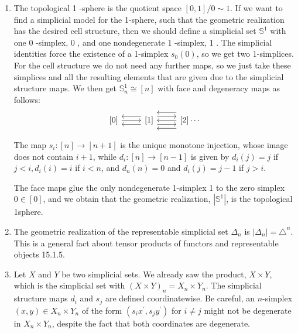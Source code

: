 \begin{example}
    \begin{enumerate}
        \item The topological 1 -sphere is the quotient space $[0,1] / 0 \sim 1$. If we want to find a simplicial model for the 1-sphere, such that the geometric realization has the desired cell structure, then we should define a simplicial set $\mathbb{S}^1$ with one 0 -simplex, 0 , and one nondegenerate 1 -simplex, 1 . The simplicial identities force the existence of a 1-simplex $s_0(0)$, so we get two 1-simplices. For the cell structure we do not need any further maps, so we just take these simplices and all the resulting elements that are given due to the simplicial structure maps. We then get $\mathbb{S}_n^1 \cong[n]$ with face and degeneracy maps as follows:
$$
\begin{tikzcd}
     {[0]} \ar[r] \ar[r, leftarrow, shift left =2] \ar[r, leftarrow, shift right =2] & {[1]} \ar[r, leftarrow] \ar[r, leftarrow, shift left =4] \ar[r, leftarrow, shift right =4] \ar[r, shift left =2] \ar[r, shift right =2] & {[2]}  \cdots
    \end{tikzcd}
$$
        
        The map $s_i:[n] \rightarrow[n+1]$ is the unique monotone injection, whose image does not contain $i+1$, while $d_i:[n] \rightarrow[n-1]$ is given by $d_i(j)=j$ if $j<i, d_i(i)=i$ if $i<n$, and $d_n(n)=0$ and $d_i(j)=j-1$ if $j>i$.
        
        The face maps glue the only nondegenerate 1-simplex 1 to the zero simplex $0 \in[0]$, and we obtain that the geometric realization, $\left|\mathbb{S}^1\right|$, is the topological 1sphere.
        \item The geometric realization of the representable simplicial set $\Delta_n$ is $\left|\Delta_n\right|=\triangle^n$. This is a general fact about tensor products of functors and representable objects 15.1.5. \item Let $X$ and $Y$ be two simplicial sets. We already saw the product, $X \times Y$, which is the simplicial set with $(X \times Y)_n=X_n \times Y_n$. The simplicial structure maps $d_i$ and $s_j$ are defined coordinatewise. Be careful, an $n$-simplex $(x, y) \in X_n \times Y_n$ of the form $\left(s_i x^{\prime}, s_j y^{\prime}\right)$ for $i \neq j$ might not be degenerate in $X_n \times Y_n$, despite the fact that both coordinates are degenerate.
    \end{enumerate}
\end{example}

